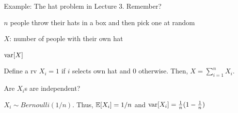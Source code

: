 \documentclass[fleqn,aspectratio=169]{beamer}
\begin{document}
\begin{frame}{Example: The hat problem in Lecture 3. Remember?}

\bigskip

{
\small
\plitemsep 0.05in
\bci 

\item $n$ people throw their hats in a box and then pick one at random

\item $X$: number of people with their own hat

\item {} $\text{var}[ X ]$

\item {} Define a rv $X_i=1$ if $i$ selects own hat and $0$ otherwise. Then, $X = \sum_{i=1}^n X_i.$

\item {} Are $X_i$s are independent? 

\medskip
\item<2-> $X_i \sim Bernoulli(1/n).$ Thus, $\mathbb{E}[ X_i ] = 1/n$ and $\text{var}[ X_i ] = \frac{1}{n}(1-\frac{1}{n})$

\eci
}
{
\small
\plitemsep 0.01in
\bci [$\circ$]
\item {}
\setlength{\jot}{0pt}
\vspace{-0.2in}
\vspace{-0.1in}

\eci

}
\end{frame}
\end{document}
